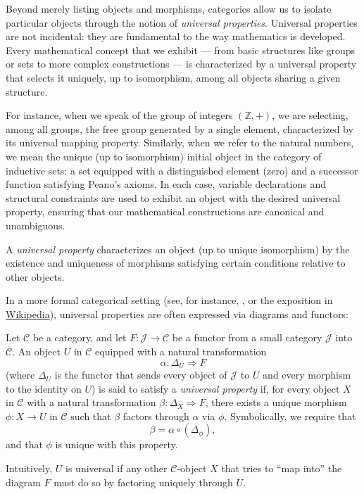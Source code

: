 \documentclass{article}
\begin{document}
Beyond merely listing objects and morphisms, categories allow us to isolate particular objects through the notion of \emph{universal properties}. Universal properties are not incidental: they are fundamental to the way mathematics is developed. Every mathematical concept that we exhibit — from basic structures like groups or sets to more complex constructions — is characterized by a universal property that selects it uniquely, up to isomorphism, among all objects sharing a given structure.

For instance, when we speak of the group of integers $(\mathbb{Z}, +)$, we are selecting, among all groups, the free group generated by a single element, characterized by its universal mapping property. Similarly, when we refer to the natural numbers, we mean the unique (up to isomorphism) initial object in the category of inductive sets: a set equipped with a distinguished element (zero) and a successor function satisfying Peano's axioms. In each case, variable declarations and structural constraints are used to exhibit an object with the desired universal property, ensuring that our mathematical constructions are canonical and unambiguous.

\begin{definition}
A \emph{universal property} characterizes an object (up to unique isomorphism) by the existence and uniqueness of morphisms satisfying certain conditions relative to other objects.
\end{definition}

In a more formal categorical setting (see, for instance, \cite{MacLane}, or the exposition in \href{https://en.wikipedia.org/wiki/Universal_property}{Wikipedia}), universal properties are often expressed via diagrams and functors:

\begin{definition}
Let \(\mathcal{C}\) be a category, and let \(F \colon \mathcal{J} \to \mathcal{C}\) be a functor from a small category \(\mathcal{J}\) into \(\mathcal{C}\). An object \(U\) in \(\mathcal{C}\) equipped with a natural transformation 
\[
\alpha \colon \Delta_U \Longrightarrow F
\]
(where \(\Delta_U\) is the functor that sends every object of \(\mathcal{J}\) to \(U\) and every morphism to the identity on \(U\)) is said to satisfy a \emph{universal property} if, for every object \(X\) in \(\mathcal{C}\) with a natural transformation \(\beta \colon \Delta_X \Longrightarrow F\), there exists a unique morphism \(\phi \colon X \to U\) in \(\mathcal{C}\) such that \(\beta\) factors through \(\alpha\) via \(\phi\). Symbolically, we require that
\[
\beta = \alpha \circ (\Delta_{\phi}),
\]
and that \(\phi\) is unique with this property.

Intuitively, \(U\) is universal if any other \(\mathcal{C}\)-object \(X\) that tries to ``map into'' the diagram \(F\) must do so by factoring uniquely through \(U\).
\end{definition}
\end{document}

